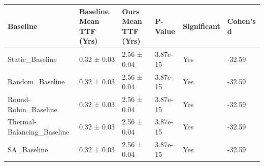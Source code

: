 \begin{tabular}{llllll}
\toprule
Baseline & Baseline Mean TTF (Yrs) & Ours Mean TTF (Yrs) & P-Value & Significant & Cohen's d \\
\midrule
Static_Baseline & 0.32 ± 0.03 & 2.56 ± 0.04 & 3.87e-15 & Yes & -32.59 \\
Random_Baseline & 0.32 ± 0.03 & 2.56 ± 0.04 & 3.87e-15 & Yes & -32.59 \\
Round-Robin_Baseline & 0.32 ± 0.03 & 2.56 ± 0.04 & 3.87e-15 & Yes & -32.59 \\
Thermal-Balancing_Baseline & 0.32 ± 0.03 & 2.56 ± 0.04 & 3.87e-15 & Yes & -32.59 \\
SA_Baseline & 0.32 ± 0.03 & 2.56 ± 0.04 & 3.87e-15 & Yes & -32.59 \\
\bottomrule
\end{tabular}
